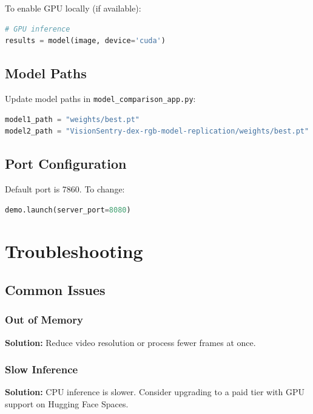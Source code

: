 \documentclass[11pt,a4paper]{article}
\begin{document}
To enable GPU locally (if available):
\begin{lstlisting}[language=Python]
# GPU inference
results = model(image, device='cuda')
\end{lstlisting}

\subsection{Model Paths}

Update model paths in \texttt{model\_comparison\_app.py}:
\begin{lstlisting}[language=Python]
model1_path = "weights/best.pt"
model2_path = "VisionSentry-dex-rgb-model-replication/weights/best.pt"
\end{lstlisting}

\subsection{Port Configuration}

Default port is 7860. To change:
\begin{lstlisting}[language=Python]
demo.launch(server_port=8080)
\end{lstlisting}

\section{Troubleshooting}

\subsection{Common Issues}

\subsubsection{Out of Memory}
\begin{tcolorbox}[colback=yellow!5!white,colframe=yellow!75!black]
\textbf{Solution:} Reduce video resolution or process fewer frames at once.
\end{tcolorbox}

\subsubsection{Slow Inference}
\begin{tcolorbox}[colback=yellow!5!white,colframe=yellow!75!black]
\textbf{Solution:} CPU inference is slower. Consider upgrading to a paid tier with GPU support on Hugging Face Spaces.
\end{tcolorbox}
\end{document}
